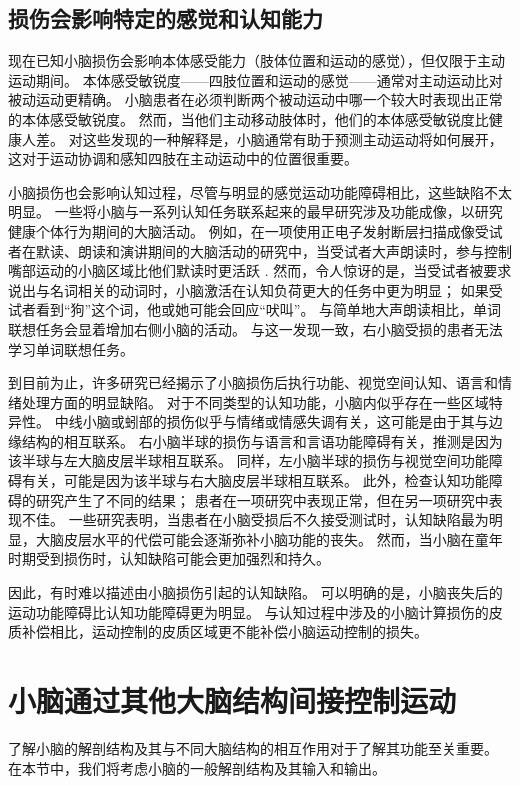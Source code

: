 \subsection{损伤会影响特定的感觉和认知能力}
现在已知小脑损伤会影响本体感受能力（肢体位置和运动的感觉），但仅限于主动运动期间。 本体感受敏锐度——四肢位置和运动的感觉——通常对主动运动比对被动运动更精确。 小脑患者在必须判断两个被动运动中哪一个较大时表现出正常的本体感受敏锐度。 然而，当他们主动移动肢体时，他们的本体感受敏锐度比健康人差。 对这些发现的一种解释是，小脑通常有助于预测主动运动将如何展开，这对于运动协调和感知四肢在主动运动中的位置很重要。

小脑损伤也会影响认知过程，尽管与明显的感觉运动功能障碍相比，这些缺陷不太明显。 一些将小脑与一系列认知任务联系起来的最早研究涉及功能成像，以研究健康个体行为期间的大脑活动。 例如，在一项使用正电子发射断层扫描成像受试者在默读、朗读和演讲期间的大脑活动的研究中，当受试者大声朗读时，参与控制嘴部运动的小脑区域比他们默读时更活跃 . 然而，令人惊讶的是，当受试者被要求说出与名词相关的动词时，小脑激活在认知负荷更大的任务中更为明显； 如果受试者看到“狗”这个词，他或她可能会回应“吠叫”。 与简单地大声朗读相比，单词联想任务会显着增加右侧小脑的活动。 与这一发现一致，右小脑受损的患者无法学习单词联想任务。

到目前为止，许多研究已经揭示了小脑损伤后执行功能、视觉空间认知、语言和情绪处理方面的明显缺陷。 对于不同类型的认知功能，小脑内似乎存在一些区域特异性。 中线小脑或蚓部的损伤似乎与情绪或情感失调有关，这可能是由于其与边缘结构的相互联系。 右小脑半球的损伤与语言和言语功能障碍有关，推测是因为该半球与左大脑皮层半球相互联系。 同样，左小脑半球的损伤与视觉空间功能障碍有关，可能是因为该半球与右大脑皮层半球相互联系。 此外，检查认知功能障碍的研究产生了不同的结果； 患者在一项研究中表现正常，但在另一项研究中表现不佳。 一些研究表明，当患者在小脑受损后不久接受测试时，认知缺陷最为明显，大脑皮层水平的代偿可能会逐渐弥补小脑功能的丧失。 然而，当小脑在童年时期受到损伤时，认知缺陷可能会更加强烈和持久。

因此，有时难以描述由小脑损伤引起的认知缺陷。 可以明确的是，小脑丧失后的运动功能障碍比认知功能障碍更为明显。 与认知过程中涉及的小脑计算损伤的皮质补偿相比，运动控制的皮质区域更不能补偿小脑运动控制的损失。



\section{小脑通过其他大脑结构间接控制运动}
了解小脑的解剖结构及其与不同大脑结构的相互作用对于了解其功能至关重要。 在本节中，我们将考虑小脑的一般解剖结构及其输入和输出。

